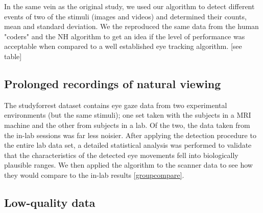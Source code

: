 \documentclass[10pt,a4paper]{extarticle}
\begin{document}
In the same vein as the original study, we used our algorithm to detect different events of two of the stimuli (images and videos) and determined their counts, mean and standard deviation. We the reproduced the same data from the human "coders" and the NH algorithm \citep{Nystrom2010AnData} to get an idea if the level of performance was acceptable when compared to a well established eye tracking algorithm. [see table]  





\subsection*{Prolonged recordings of natural viewing}

The studyforrest dataset contains eye gaze data from two experimental environments (but the same stimuli); one set taken with the subjects in a MRI machine and the other from subjects in a lab. Of the two, the data taken from the in-lab sessions was far less noisier. After applying the detection procedure to the entire lab data set, a detailed statistical analysis was performed to validate that the characteristics of the detected eye movements fell into biologically plausible ranges. We then applied the algorithm to the scanner data to see how they would compare to the in-lab results \ref{groupcompare}. 

\subsection*{Low-quality data}
\end{document}
